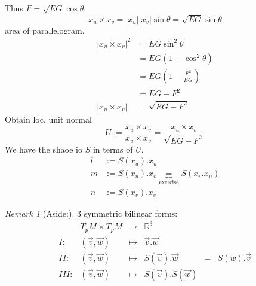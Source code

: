 \documentclass{article}
\newcommand{\R}{\mathbb{R}}
\newcommand{\abs}[1]{\left|#1\right|}
\theoremstyle{definition}
\theoremstyle{remark}
\theoremstyle{example}
\newtheorem*{remark}{Remark}
\begin{document}
	Thus $F=\sqrt{EG}\cos \theta$.\\
	\[x_u \times x_v = \abs{x_u} \abs{x_v} \sin \theta = \sqrt{EG} \sin \theta \] area of parallelogram.
	\begin{align*}
		\abs{x_u \times x_v}^2 &= EG \sin^2 \theta\\
		&= EG(1-\cos^2\theta)\\
		&=EG(1-\frac{F^2}{EG})\\
		&=EG-F^2\\
		\abs{x_u \times x_v} &= \sqrt{EG-F^2}
	\end{align*}
	Obtain loc. unit normal
	\[U:=\frac{x_u \times x_v}{x_u \times x_v} = \frac{x_u \times x_v}{\sqrt{EG-F^2}}\]
	We have the shaoe io $S$ in terms of $U$.
	\begin{align*}
		l&:=S(x_u).x_u\\
		m&:=S(x_u).x_v\underbrace{=}_{\mathrm{exercise}}S(x_v.x_u)\\
		n&:=S(x_v).x_v
	\end{align*}
	
	\begin{remark}[Aside:]
		3 symmetric bilinear forms:\\
		\[\begin{matrix}
			& T_pM \times T_pM& \to & \R^3\\
			I: & (\vec{v},\vec{w}) & \mapsto & \vec{v}.\vec{w}\\
			II:& (\vec{v},\vec{w}) & \mapsto & S(\vec{v}).\vec{w}&=&S(w).\vec{v}\\
			III:& (\vec{v},\vec{w}) & \mapsto & S(\vec{v}).S(\vec{w})
		\end{matrix}\]
	\end{remark}
\end{document}
